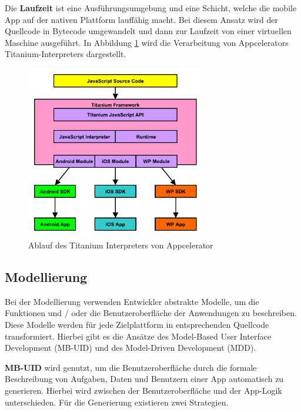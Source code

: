 \bigskip
Die \textbf{Laufzeit} ist eine Ausführungsumgebung und eine Schicht, welche die mobile App auf der nativen Plattform lauffähig macht. Bei diesem Ansatz wird der Quellcode in Bytecode umgewandelt und dann zur Laufzeit von einer virtuellen Maschine ausgeführt. In Abbildung \ref{graph_interpreter_Titanium} wird die Verarbeitung von Appcelerators Titanium-Interpreters dargestellt.

\begin{figure}[htbp]
	\centering
	\includegraphics[width=0.7\textwidth]{Bilder/Interpretation_Runtime_Titanium}
	\caption{Ablauf des Titanium Interpreters von Appcelerator}\label{graph_interpreter_Titanium}
\end{figure}

\subsection{Modellierung}
Bei der Modellierung verwenden Entwickler abstrakte Modelle, um die Funktionen und / oder die Benutzeroberfläche der Anwendungen zu beschreiben. Diese Modelle werden für jede Zielplattform in entsprechenden Quellcode transformiert. Hierbei gibt es die Ansätze des Model-Based User Interface Development (MB-UID) und des Model-Driven Development (MDD).

\bigskip
\textbf{MB-UID} wird genutzt, um die Benutzeroberfläche durch die formale Beschreibung von Aufgaben, Daten und Benutzern einer App automatisch zu generieren. Hierbei wird zwischen der Benutzeroberfläche und der App-Logik unterschieden.
Für die Generierung existieren zwei Strategien.

